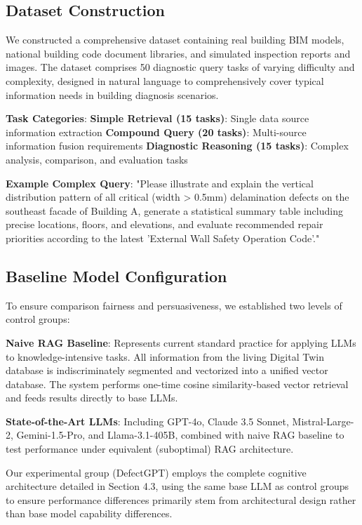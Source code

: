 \subsection{Dataset Construction}

We constructed a comprehensive dataset containing real building BIM models, national building code document libraries, and simulated inspection reports and images. The dataset comprises 50 diagnostic query tasks of varying difficulty and complexity, designed in natural language to comprehensively cover typical information needs in building diagnosis scenarios.

\textbf{Task Categories}:
\textbf{Simple Retrieval (15 tasks)}: Single data source information extraction
\textbf{Compound Query (20 tasks)}: Multi-source information fusion requirements  
\textbf{Diagnostic Reasoning (15 tasks)}: Complex analysis, comparison, and evaluation tasks

\textbf{Example Complex Query}: "Please illustrate and explain the vertical distribution pattern of all critical (width > 0.5mm) delamination defects on the southeast facade of Building A, generate a statistical summary table including precise locations, floors, and elevations, and evaluate recommended repair priorities according to the latest 'External Wall Safety Operation Code'."

\subsection{Baseline Model Configuration}

To ensure comparison fairness and persuasiveness, we established two levels of control groups:

\textbf{Naive RAG Baseline}: Represents current standard practice for applying LLMs to knowledge-intensive tasks. All information from the living Digital Twin database is indiscriminately segmented and vectorized into a unified vector database. The system performs one-time cosine similarity-based vector retrieval and feeds results directly to base LLMs.

\textbf{State-of-the-Art LLMs}: Including GPT-4o, Claude 3.5 Sonnet, Mistral-Large-2, Gemini-1.5-Pro, and Llama-3.1-405B, combined with naive RAG baseline to test performance under equivalent (suboptimal) RAG architecture.

Our experimental group (DefectGPT) employs the complete cognitive architecture detailed in Section 4.3, using the same base LLM as control groups to ensure performance differences primarily stem from architectural design rather than base model capability differences.

